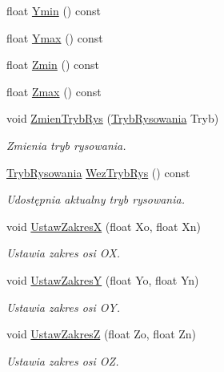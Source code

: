 \begin{DoxyCompactItemize}
\item 
float \hyperlink{class_pz_g_1_1_lacze_do_g_n_u_plota_a72aade1f962add104eba0a34073c5dd2}{Ymin} () const 
\item 
float \hyperlink{class_pz_g_1_1_lacze_do_g_n_u_plota_afb7d43adcfee4aa8150cb9474a6d8c86}{Ymax} () const 
\item 
float \hyperlink{class_pz_g_1_1_lacze_do_g_n_u_plota_ae291789be6ef8f7bfc4ee660fca57861}{Zmin} () const 
\item 
float \hyperlink{class_pz_g_1_1_lacze_do_g_n_u_plota_a65e3ac2d56a464ce6f9519eaa89d9f62}{Zmax} () const 
\item 
void \hyperlink{class_pz_g_1_1_lacze_do_g_n_u_plota_a10950349b348fd3a3d4143e95337527c}{Zmien\+Tryb\+Rys} (\hyperlink{namespace_pz_g_aeedae1ef10c66d720f9e89de408ca4ca}{Tryb\+Rysowania} Tryb)
\begin{DoxyCompactList}\small\item\em Zmienia tryb rysowania. \end{DoxyCompactList}\item 
\hyperlink{namespace_pz_g_aeedae1ef10c66d720f9e89de408ca4ca}{Tryb\+Rysowania} \hyperlink{class_pz_g_1_1_lacze_do_g_n_u_plota_a114cd58a1b8cf00cd72aac204d7743b8}{Wez\+Tryb\+Rys} () const 
\begin{DoxyCompactList}\small\item\em Udostępnia aktualny tryb rysowania. \end{DoxyCompactList}\item 
void \hyperlink{class_pz_g_1_1_lacze_do_g_n_u_plota_a9c91987dfc869d6fcea96205c581daef}{Ustaw\+Zakres\+X} (float Xo, float Xn)
\begin{DoxyCompactList}\small\item\em Ustawia zakres osi {\itshape O\+X}. \end{DoxyCompactList}\item 
void \hyperlink{class_pz_g_1_1_lacze_do_g_n_u_plota_a54c6e9cf9ab2eae479451fd953c2717c}{Ustaw\+Zakres\+Y} (float Yo, float Yn)
\begin{DoxyCompactList}\small\item\em Ustawia zakres osi {\itshape O\+Y}. \end{DoxyCompactList}\item 
void \hyperlink{class_pz_g_1_1_lacze_do_g_n_u_plota_a1dbbb2b86fb13b8632e6bad9df2a82e3}{Ustaw\+Zakres\+Z} (float Zo, float Zn)
\begin{DoxyCompactList}\small\item\em Ustawia zakres osi {\itshape O\+Z}. \end{DoxyCompactList}\item 

\end{DoxyCompactItemize}
